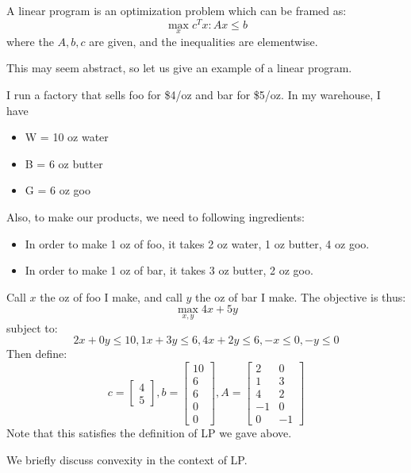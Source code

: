 \begin{definition}
    A linear program is an optimization problem which can be framed as:
    \[ \max_{x} c^T x : Ax \leq b \]
    where the $A, b, c$ are given, and the inequalities are elementwise.
\end{definition}

This may seem abstract, so let us give an example of a linear program.
\begin{example}
    I run a factory that sells foo for \$4/oz and bar for \$5/oz. In my warehouse, I have
    \begin{itemize}
        \item W = 10 oz water
        \item B = 6 oz butter
        \item G = 6 oz goo
    \end{itemize}
    Also, to make our products, we need to following ingredients:
    \begin{itemize}
        \item In order to make 1 oz of foo, it takes 2 oz water, 1 oz butter, 4 oz goo.
        \item In order to make 1 oz of bar, it takes 3 oz butter, 2 oz goo.
    \end{itemize}
    Call $x$ the oz of foo I make, and call $y$ the oz of bar I make.
    The objective is thus:
    \[ \max_{x, y} 4x + 5y \]
    subject to:
    \[ 2x + 0y \leq 10, 1x + 3y \leq 6, 4x + 2y \leq 6, -x \leq 0, -y \leq 0 \]
    Then define:
    \[ c = \begin{bmatrix}
        4 \\ 5
    \end{bmatrix}, b = \begin{bmatrix}
        10 \\ 6 \\ 6 \\ 0 \\ 0
    \end{bmatrix},
    A = \begin{bmatrix}
        2 & 0 \\ 1 & 3 \\ 4 & 2 \\ -1 & 0 \\ 0 & -1
    \end{bmatrix}\]
    Note that this satisfies the definition of LP we gave above.
\end{example}

We briefly discuss convexity in the context of LP.

